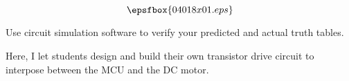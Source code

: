 

$$\epsfbox{04018x01.eps}$$

\vfil \eject






Use circuit simulation software to verify your predicted and actual truth tables.







Here, I let students design and build their own transistor drive circuit to interpose between the MCU and the DC motor.




